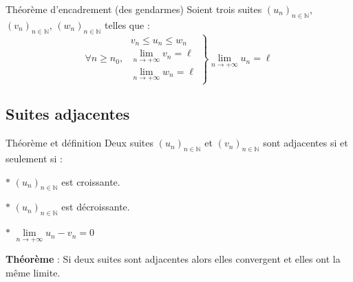 \medskip

\begin{bclogo}{Théorème d'encadrement (\og{}des gendarmes\fg{})}
Soient trois suites $(u_n)_{n\in\mathbb{N}}$, $(v_n)_{n\in\mathbb{N}}$, $(w_n)_{n\in\mathbb{N}}$ telles que :
 \[\forall n\geqslant n_0,\;\left.\begin{array}{c} v_n\leqslant u_n\leqslant w_n \\ \lim\limits_{n\to +\infty} v_n =\ell \\ \lim\limits_{n\to +\infty} w_n =\ell \end{array}\right\}\lim\limits_{n\to +\infty} u_n =\ell\] 
\end{bclogo}



\subsection{Suites adjacentes}

\begin{bclogo}{Théorème et définition}
Deux suites $(u_n)_{n\in\mathbb{N}}$ et $(v_n)_{n\in\mathbb{N}}$ sont adjacentes si et seulement si :

\noindent
$\ast$ $(u_n)_{n\in\mathbb{N}}$ est croissante.

\noindent
$\ast$ $(u_n)_{n\in\mathbb{N}}$ est décroissante.

\noindent
$\ast$ $\lim\limits_{n \to+\infty} u_n-v_n=0$

\textbf{Théorème} : Si deux suites sont adjacentes alors elles convergent et elles ont la même limite.
\end{bclogo}
